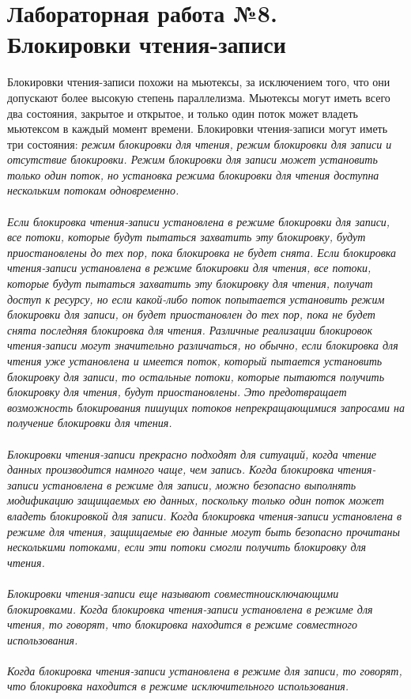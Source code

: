 \documentclass[a4paper]{article}
\begin{document}
\section{\bf Лабораторная работа №8. Блокировки чтения-записи}
Блокировки чтения-записи похожи на мьютексы, за исключением того, что они допускают более высокую степень параллелизма. Мьютексы могут иметь всего два состояния, закрытое и открытое, и только один поток может владеть мьютексом в каждый момент времени. Блокировки чтения-записи могут иметь три состояния: \sl режим блокировки для чтения, режим блокировки для записи и отсутствие блокировки. \rm Режим блокировки для записи может установить только один поток, но установка режима блокировки для чтения доступна нескольким потокам одновременно.\\\\
Если блокировка чтения-записи установлена в режиме блокировки для записи, все потоки, которые будут пытаться захватить эту блокировку, будут приостановлены до тех пор, пока блокировка не будет снята. Если блокировка чтения-записи установлена в режиме блокировки для чтения, все потоки, которые будут пытаться захватить эту блокировку для чтения, получат доступ к ресурсу, но если какой-либо поток попытается установить режим блокировки для записи, он будет приостановлен до тех пор, пока не будет снята последняя блокировка для чтения. Различные реализации блокировок чтения-записи могут значительно различаться, но обычно, если блокировка для чтения уже установлена и имеется поток, который пытается установить блокировку для записи, то остальные потоки, которые пытаются получить блокировку для чтения, будут приостановлены. Это предотвращает возможность блокирования пишущих потоков непрекращающимися запросами на получение блокировки для чтения.\\\\
Блокировки чтения-записи прекрасно подходят для ситуаций, когда чтение данных производится намного чаще, чем запись. Когда блокировка чтения-записи установлена в режиме для записи, можно безопасно выполнять модификацию защищаемых ею данных, поскольку только один поток может владеть блокировкой для записи. Когда блокировка чтения-записи установлена в режиме для чтения, защищаемые ею данные могут быть безопасно прочитаны несколькими потоками, если эти потоки смогли получить блокировку для чтения.\\\\
Блокировки чтения-записи еще называют совместноисключающими блокировками. Когда блокировка чтения-записи установлена в режиме для чтения, то говорят, что блокировка находится в режиме совместного использования. \\\\
Когда блокировка чтения-записи установлена в режиме для записи, то говорят, что блокировка находится в режиме исключительного использования.\\
\end{document}

